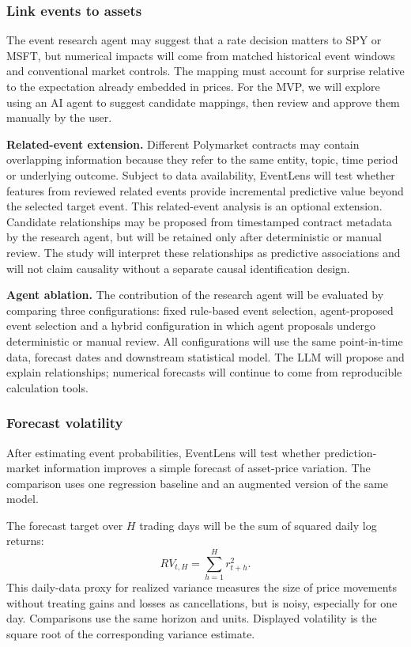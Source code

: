 \subsubsection{Link events to assets}
The event research agent may suggest that a rate decision matters to SPY or MSFT, but numerical impacts will come from matched historical event windows and conventional market controls. The mapping must account for surprise relative to the expectation already embedded in prices. For the MVP, we will explore using an AI agent to suggest candidate mappings, then review and approve them manually by the user.

\textbf{Related-event extension.}
Different Polymarket contracts may contain overlapping information because they refer to the same entity, topic, time period or underlying outcome. Subject to data availability, EventLens will test whether features from reviewed related events provide incremental predictive value beyond the selected target event. This related-event analysis is an optional extension. Candidate relationships may be proposed from timestamped contract metadata by the research agent, but will be retained only after deterministic or manual review. The study will interpret these relationships as predictive associations and will not claim causality without a separate causal identification design.

\textbf{Agent ablation.}
The contribution of the research agent will be evaluated by comparing three configurations: fixed rule-based event selection, agent-proposed event selection and a hybrid configuration in which agent proposals undergo deterministic or manual review. All configurations will use the same point-in-time data, forecast dates and downstream statistical model. The LLM will propose and explain relationships; numerical forecasts will continue to come from reproducible calculation tools.

\subsubsection{Forecast volatility}
After estimating event probabilities, EventLens will test whether prediction-market information improves a simple forecast of asset-price variation. The comparison uses one regression baseline and an augmented version of the same model.

The forecast target over $H$ trading days will be the sum of squared daily log returns:
\begin{equation}
RV_{t,H}=\sum_{h=1}^{H} r_{t+h}^{2}.
\end{equation}
This daily-data proxy for realized variance measures the size of price movements without treating gains and losses as cancellations, but is noisy, especially for one day. Comparisons use the same horizon and units. Displayed volatility is the square root of the corresponding variance estimate.

